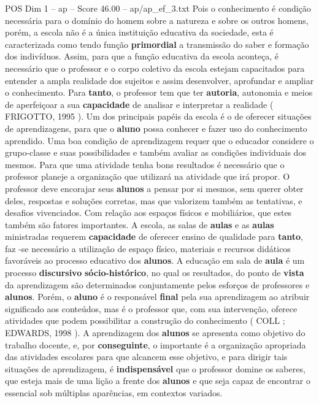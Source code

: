 \begin{textsample}{POS Dim 1 – ap – Score 46.00 – ap/ap\_ef\_3.txt}
Pois o conhecimento é condição necessária para o domínio do homem sobre a natureza e sobre os outros homens, porém, a escola não é a única instituição educativa da sociedade, esta é caracterizada como tendo função \textbf{primordial} a transmissão do saber e formação dos indivíduos.
Assim, para que a função educativa da escola aconteça, é necessário que o professor e o corpo coletivo da escola estejam capacitados para entender a ampla realidade dos sujeitos e assim desenvolver, aprofundar e ampliar o conhecimento.
Para \textbf{tanto}, o professor tem que ter \textbf{autoria}, autonomia e meios de aperfeiçoar a sua \textbf{capacidade} de analisar e interpretar a realidade ( FRIGOTTO, 1995 ).
Um dos principais papéis da escola é o de oferecer situações de aprendizagens, para que o \textbf{aluno} possa conhecer e fazer uso do conhecimento aprendido.
Uma boa condição de aprendizagem requer que o educador considere o grupo-classe e suas possibilidades e também avaliar as condições individuais dos mesmos.
Para que uma atividade tenha bons resultados é necessário que o professor planeje a organização que utilizará na atividade que irá propor.
O professor deve encorajar seus \textbf{alunos} a pensar por si mesmos, sem querer obter deles, respostas e soluções corretas, mas que valorizem também as tentativas, e desafios vivenciados.
Com relação aos espaços físicos e mobiliários, que estes também são fatores importantes.
A escola, as salas de \textbf{aulas} e as \textbf{aulas} ministradas requerem \textbf{capacidade} de oferecer ensino de qualidade para \textbf{tanto}, faz -se necessário a utilização de espaço físico, materiais e recursos didáticos favoráveis ao processo educativo dos \textbf{alunos}.
A educação em sala de \textbf{aula} é um processo \textbf{discursivo} \textbf{sócio-histórico}, no qual os resultados, do ponto de \textbf{vista} da aprendizagem são determinados conjuntamente pelos esforços de professores e \textbf{alunos}.
Porém, o \textbf{aluno} é o responsável \textbf{final} pela sua aprendizagem ao atribuir significado aos conteúdos, mas é o professor que, com sua intervenção, oferece atividades que podem possibilitar a construção do conhecimento ( COLL ; EDWARDS, 1998 ).
A aprendizagem dos \textbf{alunos} se apresenta como objetivo do trabalho docente, e, por \textbf{conseguinte}, o importante é a organização apropriada das atividades escolares para que alcancem esse objetivo, e para dirigir tais situações de aprendizagem, é \textbf{indispensável} que o professor domine os saberes, que esteja mais de uma lição a frente dos \textbf{alunos} e que seja capaz de encontrar o essencial sob múltiplas aparências, em contextos variados.

\end{textsample}
